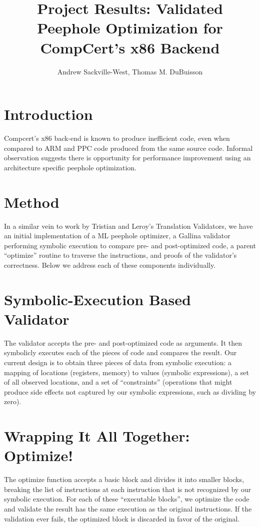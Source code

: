 \documentclass{article}
\title{Project Results: Validated Peephole Optimization for CompCert's x86 Backend}
\author{Andrew Sackville-West, Thomas M. DuBuisson}
\begin{document}
\maketitle

\section{Introduction}

Compcert's x86 back-end is known to produce inefficient code, even
when compared to ARM and PPC code produced from the same source code.
Informal observation suggests there is opportunity for performance
improvement using an architecture specific peephole optimization.

\section{Method}

In a similar vein to work by Tristian and Leroy's Translation
Validators, we have an initial implementation of a ML peephole
optimizer, a Gallina validator performing symbolic execution to
compare pre- and post-optimized code, a parent ``optimize'' routine to
traverse the instructions, and proofs of the validator's correctness.
Below we address each of these components individually.

\section{Symbolic-Execution Based Validator}

The validator accepts the pre- and post-optimized code as arguments.
It then symbolicly executes each of the pieces of code and compares
the result.  Our current design is to obtain three pieces of data from
symbolic execution: a mapping of locations (registers, memory) to
values (symbolic expressions), a set of all observed locations, and a
set of ``constraints'' (operations that might produce side effects not
captured by our symbolic expressions, such as dividing by zero).

\section{Wrapping It All Together: Optimize!}
The optimize function accepts a basic block and divides it into
smaller blocks, breaking the list of instructions at each instruction
that is not recognized by our symbolic execution.  For each of these
``executable blocks'', we optimize the code and validate the result
has the same execution as the original instructions.  If the
validation ever fails, the optimized block is discarded in favor of
the original.
\end{document}
